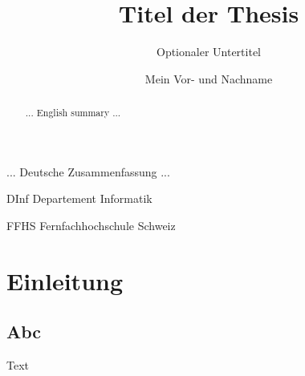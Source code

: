 \documentclass{ffhsthesis}
\begin{document}
    \title{Titel der Thesis}
    \subtitle{Optionaler Untertitel} %
    \author{Mein Vor- und Nachname}

    \dedication{Diese Thesis widme ich\\\dots}

    \maketitle


    \begin{zusammenfassung}
        ... Deutsche Zusammenfassung ...
    \end{zusammenfassung}

    \begin{abstract}
        ... English summary ...
    \end{abstract}

    \tableofcontents


    \begin{abkuerzungen}[MUSTER] %
        \item[DInf] Departement Informatik
        \item[FFHS] Fernfachhochschule Schweiz
    \end{abkuerzungen}


    \startThesis %

    \chapter{Einleitung}
    \section{Abc}

    Text

\end{document}
